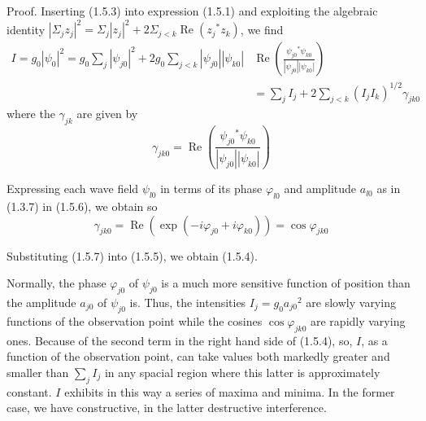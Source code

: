 \documentclass{article}
\begin{document}
Proof. Inserting (1.5.3) into expression (1.5.1) and exploiting the algebraic identity $\left|\Sigma_{j} z_{j}\right|^{2}=\Sigma_{j}\left|z_{j}\right|^{2}+2 \Sigma_{j<k} \operatorname{Re}\left(z_{j}{ }^{*} z_{k}\right)$, we find
$$
\begin{align*}
I=g_{0}\left|\psi_{0}\right|^{2}=g_{0} \sum_{j}\left|\psi_{j 0}\right|^{2}+2 g_{0} \sum_{j<k}\left|\psi_{j 0}\right|\left|\psi_{k 0}\right| & \operatorname{Re}\left(\frac{\psi_{j 0}{ }^{*} \psi_{k 0}}{\left|\psi_{j 0}\right|\left|\psi_{k 0}\right|}\right)  \tag{1.5.5}\\
& =\sum_{j} I_{j}+2 \sum_{j<k}\left(I_{j} I_{k}\right)^{1 / 2} \gamma_{j k 0}
\end{align*}
$$
where the $\gamma_{j k}$ are given by
$$
\begin{equation*}
\gamma_{j k 0}=\operatorname{Re}\left(\frac{\psi_{j 0}{ }^{*} \psi_{k 0}}{\left|\psi_{j 0}\right|\left|\psi_{k 0}\right|}\right) \tag{1.5.6}
\end{equation*}
$$

Expressing each wave field $\psi_{l 0}$ in terms of its phase $\varphi_{l 0}$ and amplitude $a_{l 0}$ as in (1.3.7) in (1.5.6), we obtain so
$$
\begin{equation*}
\gamma_{j k 0}=\operatorname{Re}\left(\exp \left(-i \varphi_{j 0}+i \varphi_{k 0}\right)\right)=\cos \varphi_{j k 0} \tag{1.5.7}
\end{equation*}
$$

Substituting (1.5.7) into (1.5.5), we obtain (1.5.4).

Normally, the phase $\varphi_{j 0}$ of $\psi_{j 0}$ is a much more sensitive function of position than the amplitude $a_{j 0}$ of $\psi_{j 0}$ is. Thus, the intensities $I_{j}=g_{0} a_{j 0}{ }^{2}$ are slowly varying functions of the observation point while the cosines $\cos \varphi_{j k 0}$ are rapidly varying ones. Because of the second term in the right hand side of (1.5.4), so, $I$, as a function of the observation point, can take values both markedly greater and smaller than $\sum_{j} I_{j}$ in any spacial region where this latter is approximately constant. $I$ exhibits in this way a series of maxima and minima. In the former case, we have constructive, in the latter destructive interference.
\end{document}
